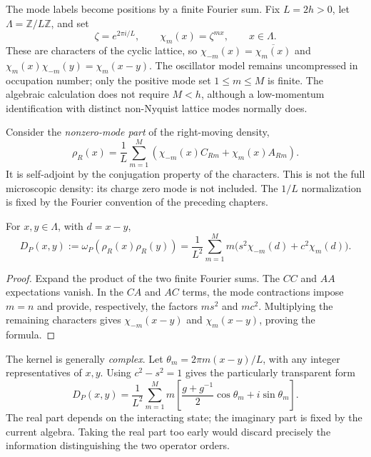 The mode labels become positions by a finite Fourier sum.  Fix
$L=2h>0$, let $\Lambda=\mathbb Z/L\mathbb Z$, and set
\begin{equation}
 \zeta=e^{2\pi i/L},\qquad
 \chi_m(x)=\zeta^{mx},\qquad x\in\Lambda.
 \label{eq:ch19-spatial-character}
\end{equation}
These are characters of the cyclic lattice, so
$\chi_{-m}(x)=\overline{\chi_m(x)}$ and
$\chi_m(x)\chi_{-m}(y)=\chi_m(x-y)$.  The oscillator model remains
uncompressed in occupation number; only the positive mode set
$1\leq m\leq M$ is finite.  The algebraic calculation does not
require $M<h$, although a low-momentum identification with distinct
non-Nyquist lattice modes normally does.

Consider the \emph{nonzero-mode part} of the right-moving density,
\begin{equation}
 \rho_R(x)=\frac1L\sum_{m=1}^{M}
 \left(\chi_{-m}(x)C_{Rm}+\chi_m(x)A_{Rm}\right).
 \label{eq:ch19-spatial-rho}
\end{equation}
It is self-adjoint by the conjugation property of the characters.
This is not the full microscopic density: its charge zero mode is
not included.  The $1/L$ normalization is fixed by the Fourier
convention of the preceding chapters.

\begin{theorem}
\label{thm:ch19-spatial-ordered}
For $x,y\in\Lambda$, with $d=x-y$,
\begin{equation}
 \boxed{\displaystyle
 D_P(x,y):=\omega_P(\rho_R(x)\rho_R(y))
 =\frac1{L^2}\sum_{m=1}^{M}m
 \bigl(s^2\chi_{-m}(d)+c^2\chi_m(d)\bigr).}
 \label{eq:ch19-spatial-ordered}
\end{equation}
\end{theorem}
\begin{proof}
Expand the product of the two finite Fourier sums.  The $CC$ and
$AA$ expectations vanish.  In the $CA$ and $AC$ terms, the mode
contractions impose $m=n$ and provide, respectively, the factors
$ms^2$ and $mc^2$.  Multiplying the remaining characters gives
$\chi_{-m}(x-y)$ and $\chi_m(x-y)$, proving the formula.
\end{proof}

The kernel is generally \emph{complex}.  Let
$\theta_m=2\pi m(x-y)/L$, with any integer representatives of
$x,y$.  Using $c^2-s^2=1$ gives the particularly transparent form
\begin{equation}
 \boxed{\displaystyle
 D_P(x,y)=\frac1{L^2}\sum_{m=1}^{M}m
 \left[\frac{g+g^{-1}}2\cos\theta_m
                   +i\sin\theta_m\right].}
 \label{eq:ch19-spatial-ordered-realimag}
\end{equation}
The real part depends on the interacting state; the imaginary part
is fixed by the current algebra.  Taking the real part too early
would discard precisely the information distinguishing the two
operator orders.

